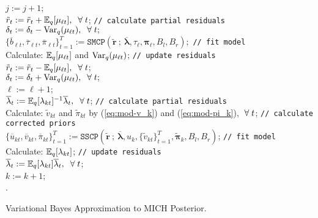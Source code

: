 \begin{algorithm}[!h]
{{      $j := j + 1$; \\
    }
     {
      $\tilde{r}_t := \tilde{r}_t + \mathbb{E}_q[\mu_{\ell t}],\; \;\forall\; t$; \texttt{// calculate partial residuals} \\
      $\delta_t := \delta_t -  \text{Var}_q(\mu_{\ell t}),\; \;\forall\; t;$ \\
      $\{\overline{b}_{\ell t}, \overline{\tau}_{\ell t}, \overline{\pi}_{\ell t}\}_{t=1}^T := \texttt{SMCP}(\tilde{\mathbf{r}} \:;\: \overline{\pmb{\lambda}}, \tau_{\ell}, \pmb{\pi}_{\ell}, B_l,B_r);$ \texttt{// fit model} \\
      Calculate: $\mathbb{E}_q[\mu_{\ell t}]$ and $\text{Var}_q(\mu_{\ell t})$; \texttt{// update residuals} \\
      $\tilde{r}_t := \tilde{r}_t - \mathbb{E}_q[\mu_{\ell t}],\; \;\forall\; t$; \\
      $\delta_t := \delta_t + \text{Var}_q(\mu_{\ell t}),\; \;\forall\; t;$ \\
      $\ell := \ell + 1$; \\
    }
     {
      $\overline{\lambda}_t := \mathbb{E}_q[\lambda_{k t}]^{-1}\overline{\lambda}_t, \; \;\forall\; t$; \texttt{// calculate partial residuals}\\
      Calculate: $\tilde{v}_{kt}$ and $\tilde{\pi}_{kt}$ by (\ref{eq:mod-v_k}) and (\ref{eq:mod-pi_k}), $\;\forall\; t$; \texttt{// calculate corrected priors} \\
      $\{\overline{u}_{kt}, \overline{v}_{kt}, \overline{\pi}_{kt}\}_{t=1}^T := \texttt{SSCP}(\tilde{\mathbf{r}} 
      \:;\:\overline{\pmb{\lambda}}, u_k, \{\tilde{v}_{kt}\}_{t=1}^T, \tilde{\pmb{\pi}}_k, B_l,B_r)$; \texttt{// fit model} \\
      Calculate: $\mathbb{E}_q[\lambda_{k t}]$; \texttt{// update residuals} \\
      $\overline{\lambda}_t := \mathbb{E}_q[\lambda_{kt}]\overline{\lambda}_t, \; \;\forall\; t$; \\
      $k := k + 1$; \\
    }
  }
  .
  \caption{Variational Bayes Approximation to MICH Posterior.}
\end{algorithm}